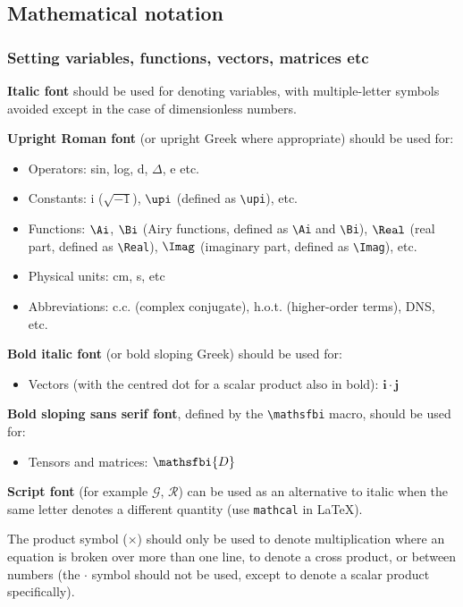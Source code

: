 \documentclass{jpp}
\begin{document}
\subsection{Mathematical notation}
\subsubsection{Setting variables, functions, vectors, matrices etc}

\textbf{Italic font} should be used for denoting variables, with multiple-letter symbols avoided except in the case of dimensionless numbers.

\textbf{Upright Roman font} (or upright Greek where appropriate) should be used for:
\begin{itemize}
\item Operators: sin, log, d, $\Delta$, e etc.
\item Constants: i ($\sqrt{-1}$), $\upi$ (defined as \verb}\upi}), etc.
\item Functions: $\Ai$, $\Bi$ (Airy functions, defined as \verb|\Ai| and \verb|\Bi|), $\Real$ (real part, defined as \verb|\Real|), $\Imag$ (imaginary part, defined as \verb|\Imag|), etc.
\item Physical units: cm, s, etc
\item Abbreviations: c.c. (complex conjugate), h.o.t. (higher-order terms), DNS, etc.
\end{itemize}

\textbf{Bold italic font} (or bold sloping Greek) should be used for:

\begin{itemize}
\item  Vectors (with the centred dot for a scalar product also in bold): $\boldsymbol{i \cdot j}$
\end{itemize}

\textbf{Bold sloping sans serif font}, defined by the \verb|\mathsfbi| macro, should be used for:
\begin{itemize}
\item Tensors and matrices: $\mathsfbi{D}$
\end{itemize}

\textbf{Script font} (for example $\mathcal{G}$, $\mathcal{R}$) can be used as an alternative to italic when the same letter denotes a different quantity (use \verb|mathcal| in \LaTeX).

The product symbol ($\times$) should only be used to denote multiplication where an equation is broken over more than one line, to denote a cross product, or between numbers (the $\cdot$ symbol should not be used, except to denote a scalar product specifically).
\end{document}
